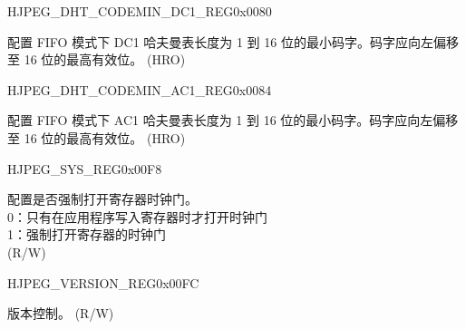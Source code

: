 \begin{register}{H}{JPEG\_DHT\_CODEMIN\_DC1\_REG}{0x0080}\label{regdesc:JPEGDHTCODEMINDC1REG}
%
\regnewline%
\begin{regdesc}\begin{reglist}
\label{fielddesc:JPEGDHTCODEMINDC1}\item [JPEG\_DHT\_CODEMIN\_DC1] 配置 FIFO 模式下 DC1 哈夫曼表长度为 1 到 16 位的最小码字。码字应向左偏移至 16 位的最高有效位。 (HRO)
\end{reglist}\end{regdesc}
\end{register}


\begin{register}{H}{JPEG\_DHT\_CODEMIN\_AC1\_REG}{0x0084}\label{regdesc:JPEGDHTCODEMINAC1REG}
%
\regnewline%
\begin{regdesc}\begin{reglist}
\label{fielddesc:JPEGDHTCODEMINAC1}\item [JPEG\_DHT\_CODEMIN\_AC1] 配置 FIFO 模式下 AC1 哈夫曼表长度为 1 到 16 位的最小码字。码字应向左偏移至 16 位的最高有效位。 (HRO)
\end{reglist}\end{regdesc}
\end{register}


\begin{register}{H}{JPEG\_SYS\_REG}{0x00F8}\label{regdesc:JPEGSYSREG}
%
%
\regnewline%
\begin{regdesc}\begin{reglist}
\label{fielddesc:JPEGCLKEN}\item [JPEG\_CLK\_EN] 配置是否强制打开寄存器时钟门。\\
0：只有在应用程序写入寄存器时才打开时钟门\\
1：强制打开寄存器的时钟门\\
(R/W)
\end{reglist}\end{regdesc}
\end{register}


\begin{register}{H}{JPEG\_VERSION\_REG}{0x00FC}\label{regdesc:JPEGVERSIONREG}
%
%
\regnewline%
\begin{regdesc}\begin{reglist}
\label{fielddesc:JPEGJPEGVER}\item [JPEG\_JPEG\_VER] 版本控制。 (R/W)
\end{reglist}\end{regdesc}
\end{register}
